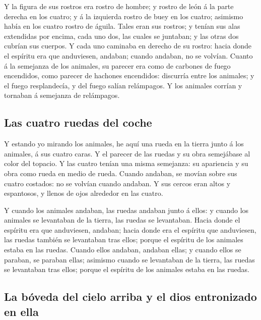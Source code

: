  Y la figura de sus rostros era rostro de hombre; y rostro
de león á la parte derecha en los cuatro; y á la izquierda rostro de
buey en los cuatro; asimismo había en los cuatro rostro de águila.
 Tales eran sus rostros; y tenían sus alas extendidas por
encima, cada uno dos, las cuales se juntaban; y las otras dos cubrían
sus cuerpos.  Y cada uno caminaba en derecho de su rostro:
hacia donde el espíritu era que anduviesen, andaban; cuando andaban, no
se volvían.  Cuanto á la semejanza de los animales, su
parecer era como de carbones de fuego encendidos, como parecer de
hachones encendidos: discurría entre los animales; y el fuego
resplandecía, y del fuego salían relámpagos.  Y los
animales corrían y tornaban á semejanza de relámpagos.

\hypertarget{las-cuatro-ruedas-del-coche}{%
\subsection{Las cuatro ruedas del
coche}\label{las-cuatro-ruedas-del-coche}}

 Y estando yo mirando los animales, he aquí una rueda en la
tierra junto á los animales, á sus cuatro caras.  Y el
parecer de las ruedas y su obra semejábase al color del topacio. Y las
cuatro tenían una misma semejanza: su apariencia y su obra como rueda en
medio de rueda.  Cuando andaban, se movían sobre sus cuatro
costados: no se volvían cuando andaban.  Y sus cercos eran
altos y espantosos, y llenos de ojos alrededor en las cuatro.

 Y cuando los animales andaban, las ruedas andaban junto á
ellos: y cuando los animales se levantaban de la tierra, las ruedas se
levantaban.  Hacia donde el espíritu era que anduviesen,
andaban; hacia donde era el espíritu que anduviesen, las ruedas también
se levantaban tras ellos; porque el espíritu de los animales estaba en
las ruedas.  Cuando ellos andaban, andaban ellas; y cuando
ellos se paraban, se paraban ellas; asimismo cuando se levantaban de la
tierra, las ruedas se levantaban tras ellos; porque el espíritu de los
animales estaba en las ruedas.

\hypertarget{la-buxf3veda-del-cielo-arriba-y-el-dios-entronizado-en-ella}{%
\subsection{La bóveda del cielo arriba y el dios entronizado en
ella}\label{la-buxf3veda-del-cielo-arriba-y-el-dios-entronizado-en-ella}}

